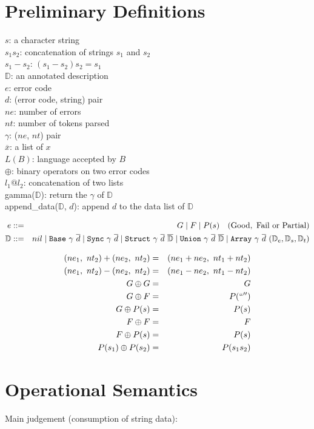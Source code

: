 \documentclass[11pt]{article}
\renewcommand{\bar}[1]{\overline #1}
\newcommand{\base}{{\tt Base}}
\newcommand{\sync}{{\tt Sync}}
\newcommand{\mystruct}{{\tt Struct}}
\newcommand{\myunion}{{\tt Union}}
\newcommand{\myarray}{{\tt Array}}
\newcommand{\D}{{\mathbb D}}
\begin{document}
\section{Preliminary Definitions}

\noindent
$s$: a character string \\
$s_1 s_2$: concatenation of strings $s_1$ and $s_2$\\
$s_1 - s_2$: $(s_1 - s_2) s_2 = s_1$ \\
$\D$: an annotated description \\
$e$: error code \\
$d$: (error code, string) pair\\
$ne$: number of errors \\
$nt$: number of tokens parsed\\
$\gamma$: ($ne$, $nt$) pair\\
$\bar x$: a list of $x$ \\
$L(B)$: language accepted by $B$\\
$\oplus$: binary operators on two error codes\\
$l_1 @ l_2$: concatenation of two lists\\
gamma($\D$): return the $\gamma$ of $\D$ \\
append\_data($\D$, $d$): append $d$ to the data list of $\D$

\begin{eqnarray*}
e &::=& G \bnfalt F \bnfalt P(s) ~~~ {\rm (Good,~ Fail~ or~ Partial)}\\
\D &::=& nil \bnfalt \base~ \gamma~ \bar{d} \bnfalt \sync~ \gamma~ \bar{d} \bnfalt 
\mystruct~ \gamma~ \bar{d}~ \bar{\D} 
\bnfalt \myunion~ \gamma~ \bar{d}~ \bar{\D} \bnfalt \myarray~ \gamma~ \bar{d}~ (\D_e, \D_s, \D_t)
\end{eqnarray*}

\begin{eqnarray*}
(ne_1,~ nt_2) + (ne_2,~ nt_2) &=& (ne_1 + ne_2,~ nt_1 + nt_2)\\
(ne_1,~ nt_2) - (ne_2,~ nt_2) &=& (ne_1 - ne_2,~ nt_1 - nt_2) \\
G \oplus G &=& G\\
G \oplus F &=& P(``'')\\
G \oplus P(s) &=& P(s)\\
F \oplus F &=& F\\
F \oplus P(s) &=& P(s)\\
P(s_1) \oplus P(s_2) &=& P(s_1 s_2)
\end{eqnarray*}

\section{Operational Semantics}
Main judgement (consumption of string data):
\end{document}

